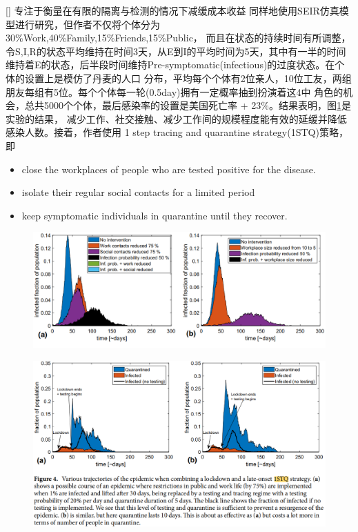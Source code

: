                 [\cite{eilersen2020cost}] 专注于衡量在有限的隔离与检测的情况下减缓成本收益 同样地使用SEIR仿真模型进行研究，但作者不仅将个体分为30\%Work,40\%Family,15\%Friends,15\%Public，
                而且在状态的持续时间有所调整，令S,I,R的状态平均维持在时间3天，从E到I的平均时间为5天，其中有一半的时间
                维持着E的状态，后半段时间维持Pre-symptomatic(infectious)的过度状态。在个体的设置上是模仿了丹麦的人口
                分布，平均每个个体有2位亲人，10位工友，两组朋友每组有5位。每个个体每一轮(0.5day)拥有一定概率抽到扮演着这4中
                角色的机会，总共5000个个体，最后感染率的设置是美国死亡率 + 23\%。结果表明，图\ref{fig:paper_result1}是实验的结果，
                减少工作、社交接触、减少工作间的规模程度能有效的延缓并降低感染人数。接着，作者使用 1 step tracing
                and quarantine strategy(1STQ)策略，即
                \begin{itemize}
                    \item close the workplaces of people who are tested positive for the disease.
                    \item isolate their regular social contacts for a limited period
                    \item keep symptomatic individuals in quarantine until they recover.
                \end{itemize}
                \begin{figure}[htbp]
                    \centering
                    \includegraphics[scale = 0.5]{./img/paper/eilersen2020cost/1}
                    \label{fig:paper_result1}
                \end{figure}
                \begin{figure}[htbp]
                    \centering
                    \includegraphics[scale = 0.3]{./img/paper/eilersen2020cost/2}
                    \label{fig:paper_result2}
                \end{figure}
